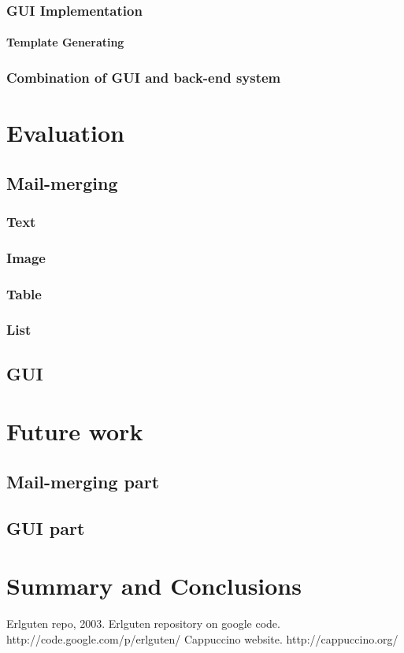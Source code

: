 \documentclass{report}
\begin{document}
\subsection{GUI Implementation}
\subsubsection{Template Generating}
\subsection{Combination of GUI and back-end system}

\chapter{Evaluation}
\section{Mail-merging}
\subsection{Text}
\subsection{Image}
\subsection{Table}
\subsection{List}
\section{GUI}

\chapter{Future work}
\section{Mail-merging part}
\section{GUI part}

\chapter{Summary and Conclusions}

\begin{thebibliography}{9}
Erlguten repo, 2003. Erlguten repository on google code. http://code.google.com/p/erlguten/
 Cappuccino website. http://cappuccino.org/
\end{thebibliography}
\end{document}
